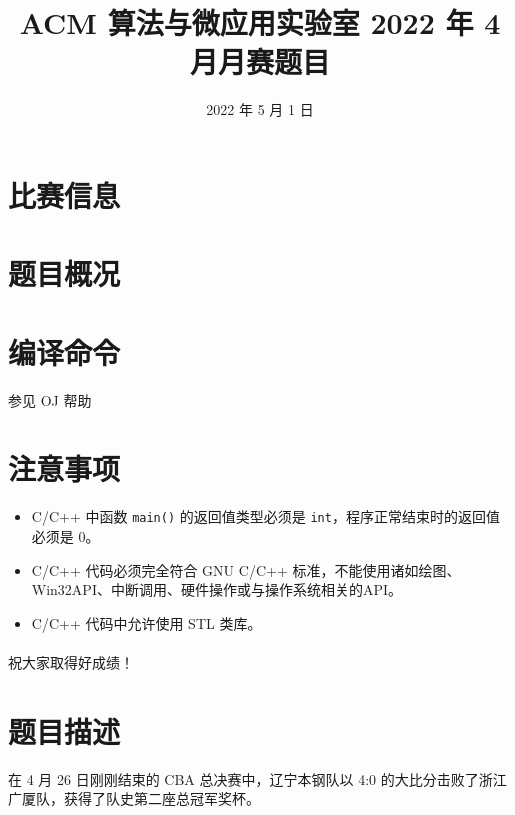 \documentclass{ctpro}
\title{ACM 算法与微应用实验室 2022 年 4 月月赛题目}
\date{2022 年 5 月 1 日}
\begin{document}
\maketitle
{}

\section*{比赛信息}


\section*{题目概况}

\problemtab

\section*{编译命令}

参见 OJ 帮助

\section*{注意事项}

\begin{itemize}
    \item C/C++ 中函数 \verb|main()| 的返回值类型必须是 \verb|int|，程序正常结束时的返回值必须是 $0$。
    \item C/C++ 代码必须完全符合 GNU C/C++ 标准，不能使用诸如绘图、Win32API、中断调用、硬件操作或与操作系统相关的API。
    \item C/C++ 代码中允许使用 STL 类库。
\end{itemize}

\paragraph*{} 祝大家取得好成绩！

\makeproblem
\section*{题目描述}

在 4 月 26 日刚刚结束的 CBA 总决赛中，辽宁本钢队以 4:0 的大比分击败了浙江广厦队，获得了队史第二座总冠军奖杯。
\end{document}
